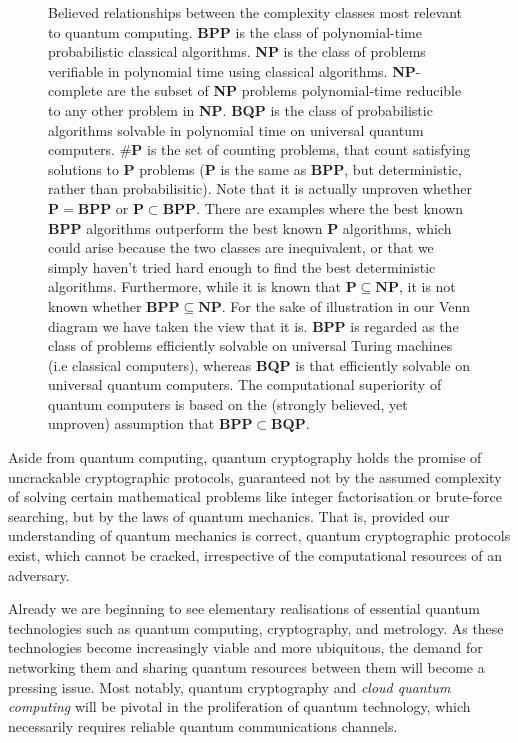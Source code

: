 \documentclass[aps,rmp,twocolumn,amsmath,amssymb,nofootinbib,superscriptaddress,longbibliography,floatfix,table-of-contents,eqsecnum]{revtex4-1}
\begin{document}
\begin{figure}[!htb]
	\caption{Believed relationships between the complexity classes most relevant to quantum computing. \textbf{BPP} is the class of polynomial-time probabilistic classical algorithms. \textbf{NP} is the class of problems verifiable in polynomial time using classical algorithms. \textbf{NP}-complete are the subset of \textbf{NP} problems polynomial-time reducible to any other problem in \textbf{NP}. \textbf{BQP} is the class of probabilistic algorithms solvable in polynomial time on universal quantum computers. $\#\mathbf{P}$ is the set of counting problems, that count satisfying solutions to \textbf{P} problems (\textbf{P} is the same as \textbf{BPP}, but deterministic, rather than probabilisitic). Note that it is actually unproven whether \mbox{$\mathbf{P}=\mathbf{BPP}$} or \mbox{$\mathbf{P}\subset\mathbf{BPP}$}. There are examples where the best known \textbf{BPP} algorithms outperform the best known \textbf{P} algorithms, which could arise because the two classes are inequivalent, or that we simply haven't tried hard enough to find the best deterministic algorithms. Furthermore, while it is known that \mbox{$\mathbf{P}\subseteq\mathbf{NP}$}, it is not known whether \mbox{$\mathbf{BPP}\subseteq\mathbf{NP}$}. For the sake of illustration in our Venn diagram we have taken the view that it is. \textbf{BPP} is regarded as the class of problems efficiently solvable on universal Turing machines (i.e classical computers), whereas \textbf{BQP} is that efficiently solvable on universal quantum computers. The computational superiority of quantum computers is based on the (strongly believed, yet unproven) assumption that \mbox{$\mathbf{BPP}\subset\mathbf{BQP}$}.} \label{fig:complexity_classes}
\end{figure}

Aside from quantum computing, quantum cryptography holds the promise of uncrackable cryptographic protocols, guaranteed not by the assumed complexity of solving certain mathematical problems like integer factorisation or brute-force searching, but by the laws of quantum mechanics. That is, provided our understanding of quantum mechanics is correct, quantum cryptographic protocols exist, which cannot be cracked, irrespective of the computational resources of an adversary.

Already we are beginning to see elementary realisations of essential quantum technologies such as quantum computing, cryptography, and metrology. As these technologies become increasingly viable and more ubiquitous, the demand for networking them and sharing quantum resources between them will become a pressing issue. Most notably, quantum cryptography and \textit{cloud quantum computing} will be pivotal in the proliferation of quantum technology, which necessarily requires reliable quantum communications channels.
\end{document}
